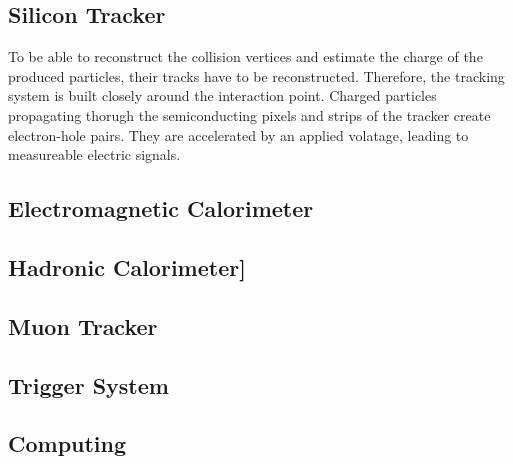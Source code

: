 \subsection*{Silicon Tracker}
To be able to reconstruct the collision vertices and estimate the charge of the produced particles, their tracks have to be reconstructed. Therefore, the tracking system is built closely around the interaction point. Charged particles propagating thorugh the semiconducting pixels and strips of the tracker create electron-hole pairs. They are accelerated by an applied volatage, leading to measureable electric signals.
\subsection*{Electromagnetic Calorimeter}
\subsection*{Hadronic Calorimeter]}
\subsection*{Muon Tracker}
\subsection*{Trigger System}
\subsection*{Computing}
